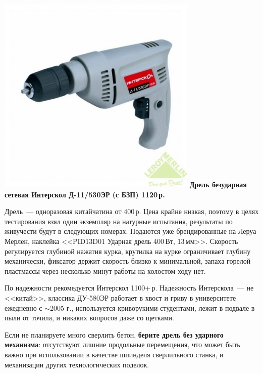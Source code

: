 {\begin{multicols}{2}
\columnbreak

\noindent\href{http://leroymerlin.ru/catalogue/instrumenty/elektroinstrument/dreli\_bezudarnye/11857763/}{
\includegraphics[width=\columnwidth]{00/fig/D_11_530ER.jpg}}
\textbf{Дрель безударная сетевая Интерскол Д-11/530ЭР (с БЗП) 1120\,р.}
\end{multicols}

Дрель\ --- одноразовая китайчатина от 400\,р. Цена крайне низкая, поэтому в
целях тестирования взял один экземпляр на натурные испытания, результаты по
живучести будут в следующих номерах. Подаются уже брендированные на Леруа
Мерлен, наклейка <<PID13D01 Ударная дрель 400\,Вт, 13\,мм>>. Скорость
регулируется глубиной нажатия курка, крутилка на курке ограничивает глубину
механически, фиксатор держит скорость близко к минимальной, запаха горелой
пластмассы через несколько минут работы на холостом ходу нет.

По надежности рекомедуется Интерскол
1100+\,р. Надежность Интерскола\ --- не <<китай>>, классика ДУ-580ЭР
работает в хвост и гриву в университете ежедневно с $\sim$2005 г., используется
криворукими студентами, лежит в подвале в пыли от точила, и никаких вопросов
даже со щетками.

Если не планируете много сверлить бетон, \textbf{берите дрель без ударного
механизма}: отсутствуют лишние продольные перемещения, что может быть важно при
использовании в качестве шпинделя сверлильного станка, и механизации других
технологических поделок.

}
